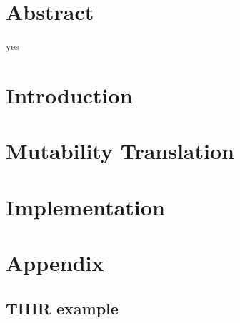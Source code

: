 \frontmatter
\chapter*{Abstract}
yes


\tableofcontents

\mainmatter

\chapter{Introduction}


\chapter{Mutability Translation}
\label{translation}


\chapter{Implementation}
\label{implementation}



\appendix




\chapter{Appendix}

\section{THIR example}

